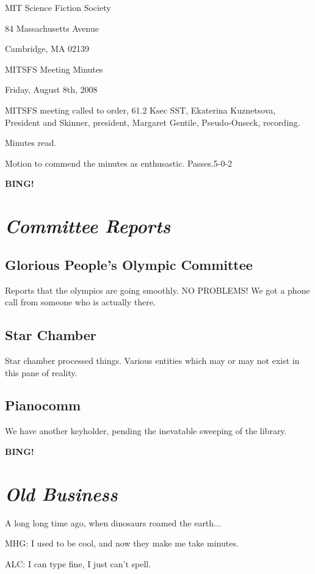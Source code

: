 \documentclass[10pt]{article}
\newcommand{\bing}{{\bf BING!} }
\newcommand{\goto}[1]{\bing \vskip 12pt \section*{{\em{#1}}}}
\begin{document}
\begin{center}

MIT Science Fiction Society

84 Massachusetts Avenue

Cambridge, MA 02139

\vspace{12pt}

MITSFS Meeting Minutes

Friday, August 8th, 2008

\end{center}

\vspace{18pt}

\setlength{\parskip}{6pt}

\noindent
MITSFS meeting called to order, 61.2 Ksec SST,
Ekaterina Kuznetsova, President and Skinner, president, Margaret Gentile, Pseudo-Onseck, recording.

Minutes read.

Motion to commend the minutes as enthusastic. Passes.5-0-2

\BING

\goto{Committee Reports}

\subsection*{Glorious People's Olympic Committee}

Reports that the olympics are going smoothly. NO PROBLEMS!
We got a phone call from someone who is actually there.

\subsection*{Star Chamber}
Star chamber processed things. Various entities which may or may not exist in this pane of reality.

\subsection*{Pianocomm}
We have another keyholder, pending the inevatable sweeping of the library.

\goto{Old Business}

A long long time ago, when dinosaurs roamed the earth...

MHG: I used to be cool, and now they make me take minutes.

ALC: I can type fine, I just can't spell.
\end{document}
